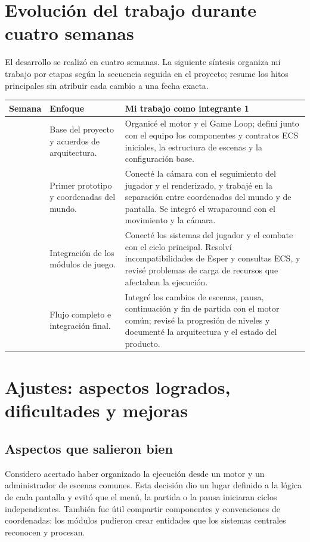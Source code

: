 \documentclass[12pt,letterpaper]{article}
\begin{document}
\clearpage
\section{Evolución del trabajo durante cuatro semanas}

El desarrollo se realizó en cuatro semanas. La siguiente síntesis organiza mi trabajo por etapas según la secuencia seguida en el proyecto; resume los hitos principales sin atribuir cada cambio a una fecha exacta.

\begin{center}
\small
\begin{tabularx}{\textwidth}{@{}>{\raggedright\arraybackslash}p{} X X@{}}
\toprule
\textbf{Semana} & \textbf{Enfoque} & \textbf{Mi trabajo como integrante 1} \\
\midrule
1 & Base del proyecto y acuerdos de arquitectura. &
Organicé el motor y el Game Loop; definí junto con el equipo los componentes y contratos ECS iniciales, la estructura de escenas y la configuración base. \\
2 & Primer prototipo y coordenadas del mundo. &
Conecté la cámara con el seguimiento del jugador y el renderizado, y trabajé en la separación entre coordenadas del mundo y de pantalla. Se integró el wraparound con el movimiento y la cámara. \\
3 & Integración de los módulos de juego. &
Conecté los sistemas del jugador y el combate con el ciclo principal. Resolví incompatibilidades de Esper y consultas ECS, y revisé problemas de carga de recursos que afectaban la ejecución. \\
4 & Flujo completo e integración final. &
Integré los cambios de escenas, pausa, continuación y fin de partida con el motor común; revisé la progresión de niveles y documenté la arquitectura y el estado del producto. \\
\bottomrule
\end{tabularx}
\end{center}

\section{Ajustes: aspectos logrados, dificultades y mejoras}

\subsection{Aspectos que salieron bien}

Considero acertado haber organizado la ejecución desde un motor y un administrador de escenas comunes. Esta decisión dio un lugar definido a la lógica de cada pantalla y evitó que el menú, la partida o la pausa iniciaran ciclos independientes. También fue útil compartir componentes y convenciones de coordenadas: los módulos pudieron crear entidades que los sistemas centrales reconocen y procesan.
\end{document}

